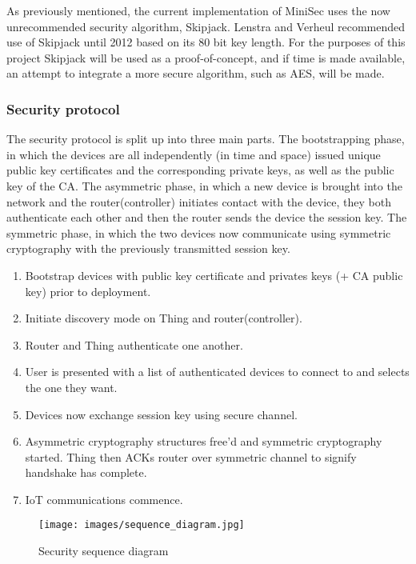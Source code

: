 \documentclass{mprop}
\begin{document}
As previously mentioned, the current implementation of MiniSec uses the now unrecommended security algorithm, Skipjack. Lenstra and Verheul recommended use of Skipjack until 2012 based on its 80 bit key length\cite{SkipjackRecommendation}. For the purposes of this project Skipjack will be used as a proof-of-concept, and if time is made available, an attempt to integrate a more secure algorithm, such as AES, will be made.


\subsubsection{Security protocol} %
\label{ssub:security_protocol}
The security protocol is split up into three main parts. The bootstrapping phase, in which the devices are all independently (in time and space) issued unique public key certificates and the corresponding private keys, as well as the public key of the CA. The asymmetric phase, in which a new device is brought into the network and the router(controller) initiates contact with the device, they both authenticate each other and then the router sends the device the session key. The symmetric phase, in which the two devices now communicate using symmetric cryptography with the previously transmitted session key.
\begin{enumerate}
  \item Bootstrap devices with public key certificate and privates keys (+ CA public key) prior to deployment.
  \item Initiate discovery mode on Thing and router(controller).
  \item Router and Thing authenticate one another.
  \item User is presented with a list of authenticated devices to connect to and selects the one they want.
  \item Devices now exchange session key using secure channel.
  \item Asymmetric cryptography structures free'd and symmetric cryptography started. Thing then ACKs router over symmetric channel to signify handshake has complete.
  \item IoT communications commence.
\end{enumerate}

\begin{figure}[h!]
\centering
\texttt{[image: images/sequence\_diagram.jpg]}
\caption{Security sequence diagram}
\label{fig:sequence_diagram}
\end{figure}
\end{document}
